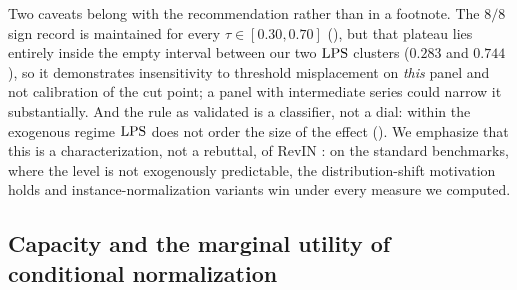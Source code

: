 Two caveats belong with the recommendation rather than in a footnote. The $8/8$ sign record is maintained for every $\tau \in [0.30, 0.70]$ (), but that plateau lies entirely inside the empty interval between our two $\mathrm{LPS}$ clusters ($0.283$ and $0.744$), so it demonstrates insensitivity to threshold misplacement on \emph{this} panel and not calibration of the cut point; a panel with intermediate series could narrow it substantially. And the rule as validated is a classifier, not a dial: within the exogenous regime $\mathrm{LPS}$ does not order the size of the effect (). We emphasize that this is a characterization, not a rebuttal, of RevIN \citep{kim2022revin}: on the standard benchmarks, where the level is not exogenously predictable, the distribution-shift motivation holds and instance-normalization variants win under every measure we computed.

\subsection{Capacity and the marginal utility of conditional normalization}

